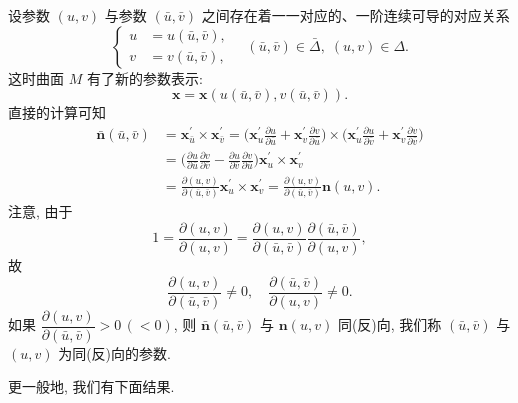 设参数 $(u,v)$ 与参数 $(\bar{u},\bar{v})$ 之间存在着一一对应的、一阶连续可导的对应关系
\[
  \left\{\begin{aligned}
    u &= u(\bar{u}, \bar{v}), \\
    v &= v(\bar{u}, \bar{v}),
  \end{aligned}\right. \quad (\bar{u}, \bar{v}) \in \bar{\Delta}, \; (u, v) \in \Delta.
\]
这时曲面 $M$ 有了新的参数表示:
\[
  \boldsymbol{x} = \boldsymbol{x}(u(\bar{u}, \bar{v}), v(\bar{u}, \bar{v})).
\]
直接的计算可知
\begin{align*}
  \bar{\boldsymbol{n}}(\bar{u}, \bar{v}) &= \boldsymbol{x}^{\prime}_{\bar{u}} \times \boldsymbol{x}^{\prime}_{\bar{v}} = \Big(\boldsymbol{x}^{\prime}_{u}\frac{\partial u}{\partial\bar{u}} + \boldsymbol{x}^{\prime}_{v}\frac{\partial v}{\partial\bar{u}}\Big) \times \Big(\boldsymbol{x}^{\prime}_{u}\frac{\partial u}{\partial\bar{v}} + \boldsymbol{x}^{\prime}_{v}\frac{\partial v}{\partial\bar{v}}\Big) \\
  &= \Big(\frac{\partial u}{\partial\bar{u}}\frac{\partial v}{\partial\bar{v}} - \frac{\partial u}{\partial\bar{v}}\frac{\partial v}{\partial\bar{u}}\Big)\boldsymbol{x}^{\prime}_{u} \times \boldsymbol{x}^{\prime}_{v} \\
  &= \frac{\partial(u,v)}{\partial(\bar{u},\bar{v})}\boldsymbol{x}^{\prime}_{u} \times \boldsymbol{x}^{\prime}_{v} = \frac{\partial(u,v)}{\partial(\bar{u},\bar{v})}\boldsymbol{n}(u,v).
\end{align*}
注意, 由于
\[
  1 = \frac{\partial(u,v)}{\partial(u,v)} = \frac{\partial(u,v)}{\partial(\bar{u},\bar{v})}\frac{\partial(\bar{u},\bar{v})}{\partial(u,v)},
\]
故
\[
  \frac{\partial(u,v)}{\partial(\bar{u},\bar{v})} \neq 0, \quad \frac{\partial(\bar{u},\bar{v})}{\partial(u,v)} \neq 0.
\]
如果 $\dfrac{\partial(u,v)}{\partial(\bar{u},\bar{v})} > 0\,(< 0)$, 则 $\bar{\boldsymbol{n}}(\bar{u},\bar{v})$ 与 $\boldsymbol{n}(u,v)$ 同(反)向, 我们称 $(\bar{u},\bar{v})$ 与 $(u,v)$ 为同(反)向的参数.

更一般地, 我们有下面结果.

